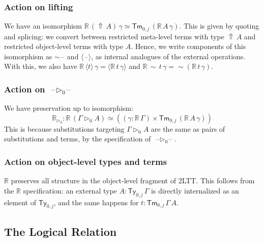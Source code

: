 \documentclass[acmsmall,review]{acmart}
\newcommand{\msf}[1]{\mathsf{#1}}
\newcommand{\mbb}[1]{\mathbb{#1}}
\newcommand{\ext}{\triangleright}
\newcommand{\Lift}{{\Uparrow}}
\newcommand{\spl}{{\sim}}
\newcommand{\qut}[1]{\langle #1\rangle}
\newcommand{\Ty}{\msf{Ty}}
\newcommand{\Tm}{\msf{Tm}}
\newcommand{\blank}{{\mathord{\hspace{1pt}\text{--}\hspace{1pt}}}}
\newcommand{\re}{\mbb{R}}
\theoremstyle{remark}
\begin{document}
\subsubsection{Action on lifting} We have an isomorphism $\re\,(\Lift\,A)\,\gamma \simeq
\Tm_{0,j}\,(\re\,A\,\gamma)$. This is given by quoting and splicing: we convert
between restricted meta-level terms with type $\Lift\,A$ and restricted
object-level terms with type $A$. Hence, we write components of this isomorphism
as $\spl\blank$ and $\qut{\blank}$, as internal analogues of the external
operations. With this, we also have $\re\,\qut{t}\,\gamma =
\qut{\re\,t\,\gamma}$ and $\re\,\spl\,t\,\gamma = \spl(\re\,t\,\gamma)$.

\subsubsection{Action on $\blank\ext_0\blank$} We have preservation up to isomorphism:
\[
  \re_{\ext_0} : \re\,(\Gamma \ext_0 A) \simeq ((\gamma : \re\,\Gamma)\times \Tm_{0,j}\,(\re\,A\,\gamma))
\]
This is because substitutions targeting $\Gamma \ext_0 A$ are the same as
pairs of substitutions and terms, by the specification of $\blank\!\ext_0\!\blank$.

\subsubsection{Action on object-level types and terms} $\re$ preserves all structure
in the object-level fragment of 2LTT. This follows from the $\re$ specification:
an external type $A : \Ty_{0,j}\,\Gamma$ is directly internalized as an element
of $\Ty_{0,j}$, and the same happens for $t : \Tm_{0,j}\,\Gamma\,A$.


\subsection{The Logical Relation}
\end{document}
